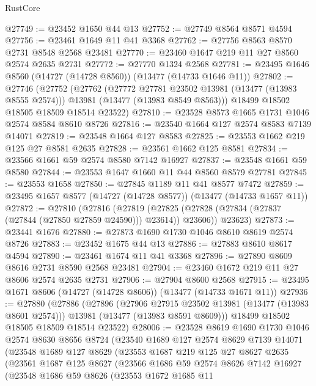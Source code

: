 \begin{lexlean}{RustCore}
\begin{coremodule}
@27749 := @23452 @1650 @44 @13
@27752 := @27749 @8564 @8571 @4594
@27756 := @23461 @1649 @11 @41 @3368
@27762 := @27756 @8563 @8570 @2731 @8548 @2568 @23481
@27770 := @23460 @1647 @219 @11 @27 @8560 @2574 @2635 @2731
@27772 := @27770 @1324 @2568
@27781 := @23495 @1646 @8560 (@14727 (@14728 @8560)) (@13477 (@14733 @1646 @11))
@27802 := @27746
    (@27752
      (@27762
        (@27772 @27781 @23502 @13981 (@13477 (@13983 @8555 @2574)))
        @13981
        (@13477 (@13983 @8549 @8563)))
      @18499
      @18502
      @18505
      @18509
      @18514
      @23522)
@27810 := @23528 @8573 @1665 @1731 @1046 @2574 @8584 @8610 @8726
@27816 := @23540 @1664 @127 @2574 @8583 @7139 @14071
@27819 := @23548 @1664 @127 @8583
@27825 := @23553 @1662 @219 @125 @27 @8581 @2635
@27828 := @23561 @1662 @125 @8581
@27834 := @23566 @1661 @59 @2574 @8580 @7142 @16927
@27837 := @23548 @1661 @59 @8580
@27844 := @23553 @1647 @1660 @11 @44 @8560 @8579 @27781
@27845 := @23553 @1658
@27850 := @27845 @1189 @11 @41 @8577 @7472
@27859 := @23495 @1657 @8577 (@14727 (@14728 @8577)) (@13477 (@14733 @1657 @11))
@27872 := @27810
    (@27816
      (@27819 (@27825 (@27828 (@27834 (@27837 (@27844 (@27850 @27859 @24590))) @23614)) @23606))
      @23623)
@27873 := @23441 @1676
@27880 := @27873 @1690 @1730 @1046 @8610 @8619 @2574 @8726
@27883 := @23452 @1675 @44 @13
@27886 := @27883 @8610 @8617 @4594
@27890 := @23461 @1674 @11 @41 @3368
@27896 := @27890 @8609 @8616 @2731 @8590 @2568 @23481
@27904 := @23460 @1672 @219 @11 @27 @8606 @2574 @2635 @2731
@27906 := @27904 @8600 @2568
@27915 := @23495 @1671 @8606 (@14727 (@14728 @8606)) (@13477 (@14733 @1671 @11))
@27936 := @27880
    (@27886
      (@27896
        (@27906 @27915 @23502 @13981 (@13477 (@13983 @8601 @2574)))
        @13981
        (@13477 (@13983 @8591 @8609)))
      @18499
      @18502
      @18505
      @18509
      @18514
      @23522)
@28006 := @23528
    @8619
    @1690
    @1730
    @1046
    @2574
    @8630
    @8656
    @8724
    (@23540
      @1689
      @127
      @2574
      @8629
      @7139
      @14071
      (@23548
        @1689
        @127
        @8629
        (@23553
          @1687
          @219
          @125
          @27
          @8627
          @2635
          (@23561
            @1687
            @125
            @8627
            (@23566
              @1686
              @59
              @2574
              @8626
              @7142
              @16927
              (@23548
                @1686
                @59
                @8626
                (@23553
                  @1672
                  @1685
                  @11

\end{coremodule}
\end{lexlean}
